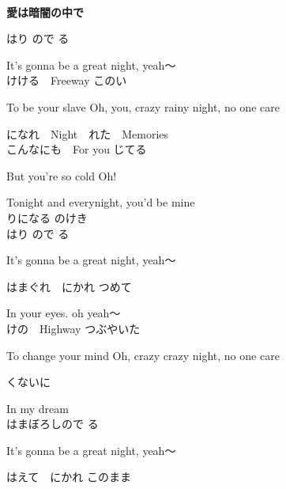 \documentclass[]{article}
\begin{document}
\begin{spacing}{1.15}

\pagestyle{empty} 　　　　%
\thispagestyle{empty} 　　　%

\textbf{{\huge 愛は暗闇の中で}}
\vspace{0.5em}
\\

\large{
はり
ので
る　

It's gonna be a great night, yeah～
\\

けける　Freeway
このい　

To be your slave
Oh, you, crazy rainy night, no one care

になれ　Night　れた　Memories
\\

こんなにも　For you
じてる　

But you're so cold
Oh! 

Tonight and everynight, you'd be mine
\\

りになる
のけき
\\

はり
ので
る　

It's gonna be a great night, yeah～

はまぐれ　にかれ
つめて　

In your eyes. oh yeah～
\\

けの　Highway
つぶやいた　

To change your mind
Oh, crazy crazy night, no one care

くないに　

In my dream
\\

はまぼろしので
る　

It's gonna be a great night, yeah～

はえて　にかれ
このまま 

}
\end{spacing}
\end{document}
